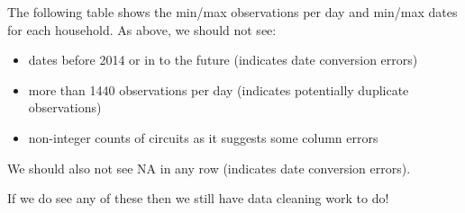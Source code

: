 \documentclass[]{article}
\providecommand{\tightlist}{%
  \setlength{\itemsep}{0pt}\setlength{\parskip}{0pt}}
\begin{document}
The following table shows the min/max observations per day and min/max
dates for each household. As above, we should not see:

\begin{itemize}
\tightlist
\item
  dates before 2014 or in to the future (indicates date conversion
  errors)
\item
  more than 1440 observations per day (indicates potentially duplicate
  observations)
\item
  non-integer counts of circuits as it suggests some column errors
\end{itemize}

We should also not see NA in any row (indicates date conversion errors).

If we do see any of these then we still have data cleaning work to do!
\end{document}
